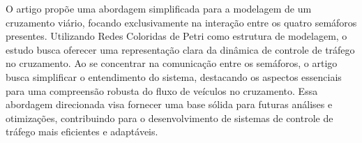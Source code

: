 O artigo propõe uma abordagem simplificada para a modelagem de um cruzamento viário, focando exclusivamente na interação entre os quatro semáforos presentes.
Utilizando Redes Coloridas de Petri como estrutura de modelagem, o estudo busca oferecer uma representação clara da dinâmica de controle de tráfego no cruzamento.
Ao se concentrar na comunicação entre os semáforos, o artigo busca simplificar o entendimento do sistema, destacando os aspectos essenciais para uma compreensão robusta do fluxo de veículos no cruzamento.
Essa abordagem direcionada visa fornecer uma base sólida para futuras análises e otimizações, contribuindo para o desenvolvimento de sistemas de controle de tráfego mais eficientes e adaptáveis.